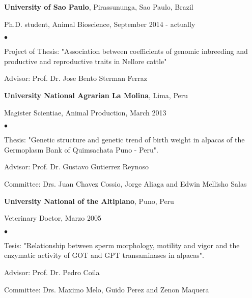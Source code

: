 \documentclass[margin,line,10pt]{res}
\newenvironment{list1}{
  \begin{list}{\ding{113}}{%
      \setlength{\itemsep}{0in}
      \setlength{\parsep}{0in} \setlength{\parskip}{0in}
      \setlength{\topsep}{0in} \setlength{\partopsep}{0in} 
      \setlength{\leftmargin}{0.17in}}}{\end{list}}
\newenvironment{list2}{
  \begin{list}{$\bullet$}{%
      \setlength{\itemsep}{0in}
      \setlength{\parsep}{0in} \setlength{\parskip}{0in}
      \setlength{\topsep}{0in} \setlength{\partopsep}{0in} 
      \setlength{\leftmargin}{0.2in}}}{\end{list}}
\begin{document}
\begin{resume}
{\bf University of Sao Paulo}, Pirassununga, Sao Paulo, Brazil\\
\vspace*{-.1in}
\begin{list1}
\item[] Ph.D. student, Animal Bioscience, September 2014 - actually
\begin{list2}
\vspace*{.05in}
\item Project of Thesis: "Association between coefficients of genomic inbreeding and productive and reproductive traits in Nellore cattle" 
\item Advisor: Prof. Dr. Jose Bento Sterman Ferraz 
\end{list2}
\vspace*{.05in}
\end{list1}

{\bf University National Agrarian La Molina}, Lima, Peru\\
\vspace*{-.1in}
\begin{list1}
\item[] Magister Scientiae, Animal Production, March 2013
\begin{list2}
\vspace*{.05in}
\item Thesis: "Genetic structure and genetic trend of birth weight in alpacas of the Germoplasm Bank of Quimsachata Puno - Peru". 
\item Advisor: Prof. Dr. Gustavo Gutierrez Reynoso 
\item Committee: Drs. Juan Chavez Cossio, Jorge Aliaga and Edwin Mellisho Salas
\end{list2}
\vspace*{.05in}
\end{list1}

{\bf University National of the Altiplano}, Puno, Peru\\
\vspace*{-.1in}
\begin{list1}
\item[] Veterinary Doctor,  Marzo 2005
\begin{list2}
\vspace*{.05in}
\item Tesis: "Relationship between sperm morphology, motility and vigor and the enzymatic activity of GOT and GPT transaminases in alpacas". 
\item Advisor: Prof. Dr. Pedro Coila 
\item Committee: Drs. Maximo Melo, Guido Perez and Zenon Maquera
\end{list2}
\end{list1}


\end{resume}
\end{document}
